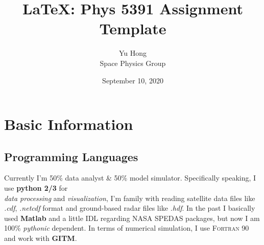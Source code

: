\documentclass[12pt, letterpaper]{article} %
\begin{document}
\title{\LaTeX: Phys 5391 Assignment Template} %
\author{Yu Hong\\Space Physics Group} %
\date{September 10, 2020}  %
\maketitle %
\newpage %
\tableofcontents %
\newpage %
\linenumbers %





\section{Basic Information} %
\subsection{Programming Languages} %
Currently I'm 50\% data \vspace{3mm} analyst \& 50\% model \hspace{5mm} simulator. %
Specifically speaking, I use \textbf{python 2/3} for  \\ %
\textit{data processing} and \emph{visualization}, I'm family with  %
reading satellite data files like \textit{.cdf}, \textit{.netcdf} format and ground-based radar files like \textit{.hdf}. 
In the past I basically used \textbf{Matlab} and a little \textsf{IDL} regarding NASA SPEDAS packages, but now I 
am 100\% \textit{pythonic} dependent. In terms of numerical simulation, I use \textsc{Fortran 90} and work with \textbf{GITM}. 
\end{document}
